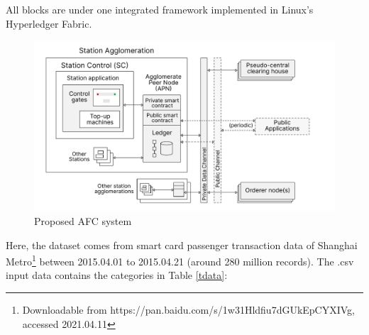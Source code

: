 \documentclass[a4paper,12pt,oneside, utf8x]{report}
\begin{document}
\begin{enumerate}
All blocks are under one integrated framework implemented in Linux’s Hyperledger Fabric. 

    \begin{figure}[H]
        \centering
        \includegraphics[width=.96\textwidth]{figures/bafc-main.pdf}
        \caption{Proposed AFC system}
        \label{f33}
    \end{figure}
    
Here, the dataset comes from smart card passenger transaction data of Shanghai Metro\footnote{Downloadable from https://pan.baidu.com/s/1w31Hldfiu7dGUkEpCYXIVg, accessed 2021.04.11} between 2015.04.01 to 2015.04.21 (around 280 million records). The .csv input data contains the categories in Table \ref{tdata}:

\begin{table}[]
\caption{Sample metro data}
\end{table}


\end{enumerate}
\end{document}

